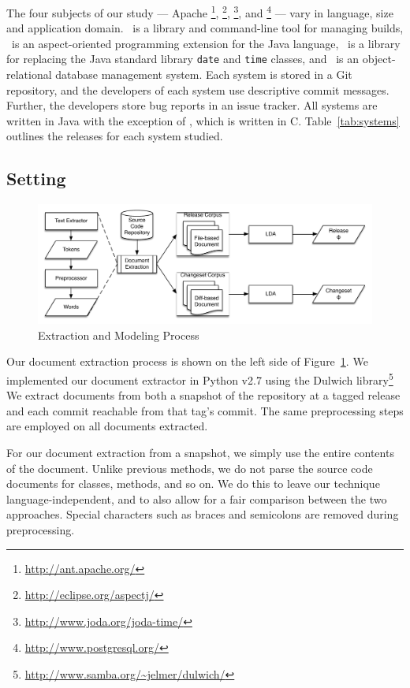 The four subjects of our study ---
Apache \ant\footnote{\url{http://ant.apache.org/}},
\aspectj\footnote{\url{http://eclipse.org/aspectj/}},
\jodatime\footnote{\url{http://www.joda.org/joda-time/}},
and \postgres\footnote{\url{http://www.postgresql.org/}}
--- vary in language, size and application domain.
\ant\ is a library and command-line tool for managing builds,
\aspectj\ is an aspect-oriented programming extension for the Java language,
\jodatime\ is a library for replacing the Java standard library \texttt{date} and \texttt{time} classes,
and \postgres\ is an object-relational database management system.
Each system is stored in a Git repository, and the developers of each system use descriptive commit messages.
Further, the developers store bug reports in an issue tracker.
All systems are written in Java with the exception of \postgres,
which is written in C. Table~\ref{tab:systems} outlines the releases for
each system studied.


\subsection{Setting}

\begin{figure}[!th]
    \centering
    \includegraphics[width=.75\textwidth]{changeset}
    \caption{Extraction and Modeling Process}
    \label{fig:process}
\end{figure}

Our document extraction process is shown on the left side of Figure~\ref{fig:process}.
We implemented our document extractor in Python v2.7
using the Dulwich library\footnote{\url{http://www.samba.org/~jelmer/dulwich/}} %
We extract documents from both a snapshot of the repository at a tagged
release and each commit reachable from that tag's commit.
The same preprocessing steps are employed on all documents extracted.

For our document extraction from a snapshot,
we simply use the entire contents of the document.
Unlike previous methods, %
we do not parse the source code documents for classes, methods, and so on.
We do this to leave our technique language-independent,
and to also allow for a fair comparison between the two approaches.
Special characters such as braces and semicolons are removed during
preprocessing.

